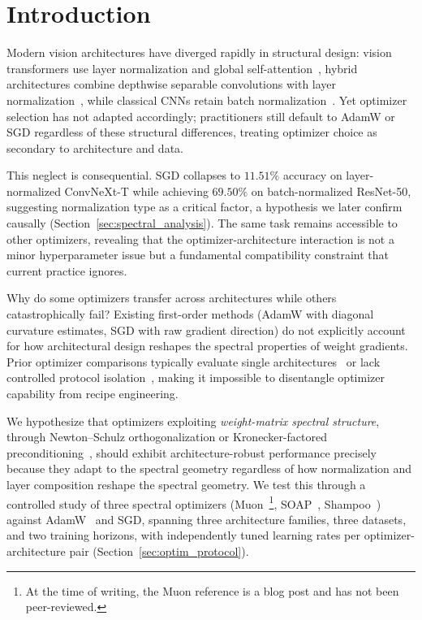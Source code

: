 \section{Introduction}
\label{sec:introduction}

Modern vision architectures have diverged rapidly in structural design: vision transformers use layer normalization and global self-attention~\cite{touvron2021training}, hybrid architectures combine depthwise separable convolutions with layer normalization~\cite{liu2022convnet}, while classical CNNs retain batch normalization~\cite{he2016deep}. Yet optimizer selection has not adapted accordingly; practitioners still default to AdamW or SGD regardless of these structural differences, treating optimizer choice as secondary to architecture and data.

This neglect is consequential. SGD collapses to $11.51\%$ accuracy on layer-normalized ConvNeXt-T while achieving $69.50\%$ on batch-normalized ResNet-50, suggesting normalization type as a critical factor, a hypothesis we later confirm causally (Section~\ref{sec:spectral_analysis}). The same task remains accessible to other optimizers, revealing that the optimizer-architecture interaction is not a minor hyperparameter issue but a fundamental compatibility constraint that current practice ignores.

Why do some optimizers transfer across architectures while others catastrophically fail? Existing first-order methods (AdamW with diagonal curvature estimates, SGD with raw gradient direction) do not explicitly account for how architectural design reshapes the spectral properties of weight gradients. Prior optimizer comparisons typically evaluate single architectures~\cite{schmidt2021crowdedvalley} or lack controlled protocol isolation~\cite{choi2020optimizers}, making it impossible to disentangle optimizer capability from recipe engineering.

We hypothesize that optimizers exploiting \emph{weight-matrix spectral structure}, through Newton--Schulz orthogonalization or Kronecker-factored preconditioning~\cite{bernstein2024old}, should exhibit architecture-robust performance precisely because they adapt to the spectral geometry regardless of how normalization and layer composition reshape the spectral geometry. We test this through a controlled study of three spectral optimizers (Muon~\cite{jordan2024muon}\footnote{At the time of writing, the Muon reference is a blog post and has not been peer-reviewed.}, SOAP~\cite{vyas2025soap}, Shampoo~\cite{gupta2018shampoo}) against AdamW~\cite{loshchilov2019decoupled} and SGD, spanning three architecture families, three datasets, and two training horizons, with independently tuned learning rates per optimizer-architecture pair (Section~\ref{sec:optim_protocol}).

